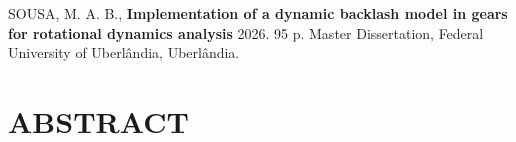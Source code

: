 
{
	\cleardoublepage
	\let\clearpage\relax
	\noindent SOUSA, M. A. B., \textbf{Implementation of a dynamic backlash model in gears for rotational dynamics analysis} 2026. 95 p. Master Dissertation, Federal University of Uberlândia, Uberlândia.
	
	\chapter*{\MakeUppercase{Abstract}}
}



